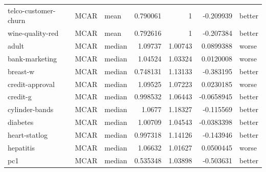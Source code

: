 \begin{table}[ht]
\begin{tabular}{lllrrrl}
 telco-customer-churn & MCAR        & mean             &                                 0.790061 &                             1        &                    -0.209939   & better               \\
 wine-quality-red     & MCAR        & mean             &                                 0.792616 &                             1        &                    -0.207384   & better               \\
 adult                & MCAR        & median           &                                 1.09737  &                             1.00743  &                     0.0899388  & worse                \\
 bank-marketing       & MCAR        & median           &                                 1.04524  &                             1.03324  &                     0.0120008  & worse                \\
 breast-w             & MCAR        & median           &                                 0.748131 &                             1.13133  &                    -0.383195   & better               \\
 credit-approval      & MCAR        & median           &                                 1.09525  &                             1.07223  &                     0.0230185  & worse                \\
 credit-g             & MCAR        & median           &                                 0.998532 &                             1.06443  &                    -0.0658945  & better               \\
 cylinder-bands       & MCAR        & median           &                                 1.0677   &                             1.18327  &                    -0.115569   & better               \\
 diabetes             & MCAR        & median           &                                 1.00709  &                             1.04543  &                    -0.0383398  & better               \\
 heart-statlog        & MCAR        & median           &                                 0.997318 &                             1.14126  &                    -0.143946   & better               \\
 hepatitis            & MCAR        & median           &                                 1.06632  &                             1.01627  &                     0.0500445  & worse                \\
 pc1                  & MCAR        & median           &                                 0.535348 &                             1.03898  &                    -0.503631   & better               \\

\end{tabular}
\end{table}
